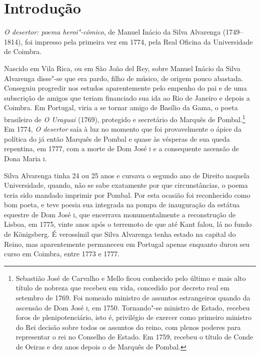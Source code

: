 \chapter[Introdução, \emph{por Clara S. Santos e Ricardo M. Valle}]{Introdução}


\textit{O desertor: poema heroi"-cômico}, de Manuel Inácio
da Silva Alvarenga (1749--1814), foi impresso pela primeira
vez em 1774, pela Real Oficina da Universidade de Coimbra.

Nascido em Vila Rica, ou em São João del Rey, sobre Manuel Inácio da Silva
Alvarenga disse"-se que era pardo, filho de músico, de origem pouco abastada.
Conseguiu progredir nos estudos aparentemente pelo empenho do pai e de uma
subscrição de amigos que teriam financiado sua ida ao Rio de Janeiro e depois a
Coimbra. Em Portugal, viria a se tornar amigo de Basílio da Gama, o poeta
brasileiro de \textit{O Uraguai} (1769), protegido e secretário do Marquês de
Pombal.\footnote{  Sebastião José de Carvalho e Mello ficou conhecido pelo último
e mais alto título de nobreza que recebeu em vida, concedido por decreto real em
setembro de 1769. Foi nomeado ministro de assuntos estrangeiros quando da
ascensão de Dom José \textsc{i}, em 1750. Tornando"-se ministro de Estado,
recebeu foros de plenipotenciário, isto é, privilégio de exercer como primeiro
ministro do Rei decisão sobre todos os assuntos do reino, com plenos poderes
para representar o rei no Conselho de Estado. Em 1759, recebeu o título de Conde
de Oeiras e dez anos depois o de Marquês de Pombal. }  Em 1774, \textit{O
desertor} saía à luz no momento que foi provavelmente o ápice da política do já
então Marquês de Pombal e quase às vésperas de sua queda repentina, em 1777, com
a morte de Dom José \textsc{i} e a consequente ascensão de Dona Maria
\textsc{i}.

Silva Alvarenga tinha 24 ou 25 anos e cursava o segundo ano de Direito naquela
Universidade, quando, não se sabe exatamente por que circunstâncias, o poema
teria sido mandado imprimir por Pombal. Por esta ocasião foi reconhecido como
bom poeta, e teve poesia sua integrada na pompa de inauguração da estátua
equestre de Dom José \textsc{i}, que encerrava monumentalmente a reconstrução de
Lisboa, em 1775, vinte anos após o terremoto de que até Kant falou, lá no fundo
de K\"onigsberg.  É verossímil que Silva Alvarenga tenha estado na capital do
Reino, mas aparentemente permaneceu em Portugal apenas enquanto durou seu curso
em Coimbra, entre 1773 e 1777.

